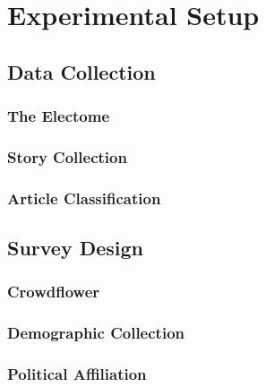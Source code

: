 
\chapter{Experimental Setup}


\section{Data Collection}

\subsection{The Electome}
\subsection{Story Collection}
\subsection{Article Classification}

\section{Survey Design}

\subsection{Crowdflower}
\subsection{Demographic Collection}
\subsection{Political Affiliation}

